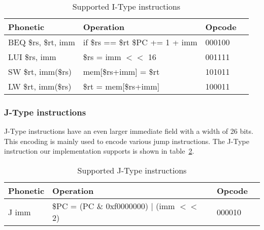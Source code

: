 
\begin{table}[h]
    \begin{tabular}{l|l|l|l}

    Phonetic & Operation & Opcode \\
    \hline
    BEQ \$rs, \$rt, imm  & if \$rs == \$rt \$PC += 1 + imm & 000100 \\
    LUI \$rs, imm        & \$rs = imm $<<$ 16                & 001111 \\
    SW \$rt, imm(\$rs)   & mem[\$rs+imm] = \$rt            & 101011 \\
    LW \$rt, imm(\$rs)   & \$rt = mem[\$rs+imm]            & 100011 \\
    \hline
    
    \end{tabular}

    \caption{Supported I-Type instructions}
    \label{table:itype_instructions}
\end{table}

\FloatBarrier
\subsubsection{J-Type instructions}
J-Type instructions have an even larger immediate field with a width 
of 26 bits. This encoding is mainly used to encode various jump instructions.
The J-Type instruction our implementation supports is shown in 
table~\ref{table:jtype_instructions}.


\begin{table}[h]
    \begin{tabular}{l|l|l|l}

    Phonetic & Operation & Opcode \\
    \hline
    J imm  & \$PC = (PC \& 0xf0000000) | (imm $<<$ 2) & 000010 \\
    \hline
    
    \end{tabular}

    \caption{Supported J-Type instructions}
    \label{table:jtype_instructions}
\end{table}

